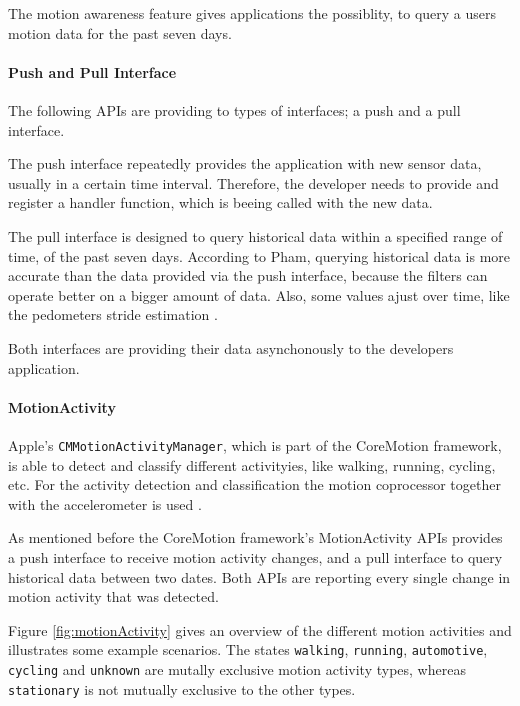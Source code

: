 The motion awareness feature gives applications the possiblity, to query a users motion data for the past seven days.

\paragraph{Push and Pull Interface}
The following \acsp{API} are providing to types of interfaces; a push and a pull interface.

The push interface repeatedly provides the application with new sensor data, usually in a certain time interval.
Therefore, the developer needs to provide and register a handler function, which is beeing called with the new data.

The pull interface is designed to query historical data within a specified range of time, of the past seven days.
According to Pham, querying historical data is more accurate than the data provided via the push interface, because the filters can operate better on a bigger amount of data.
Also, some values ajust over time, like the pedometers stride estimation \cite{wwdc_2014}.

Both interfaces are providing their data asynchonously to the developers application.


\paragraph{MotionActivity}

Apple's \texttt{CMMotionActivityManager}, which is part of the CoreMotion framework, is able to detect and classify different activityies, like walking, running, cycling, etc.
For the activity detection and classification the motion coprocessor together with the accelerometer is used \cite{wwwdc_2014}.

As mentioned before the CoreMotion framework's MotionActivity \acsp{API} provides a push interface to receive motion activity changes, and a pull interface to query historical data between two dates.
Both \acsp{API} are reporting every single change in motion activity that was detected.

Figure \ref{fig:motionActivity} gives an overview of the different motion activities and illustrates some example scenarios.
The states \texttt{walking}, \texttt{running}, \texttt{automotive}, \texttt{cycling} and \texttt{unknown} are mutally exclusive motion activity types, whereas \texttt{stationary} is not mutually exclusive to the other types.

